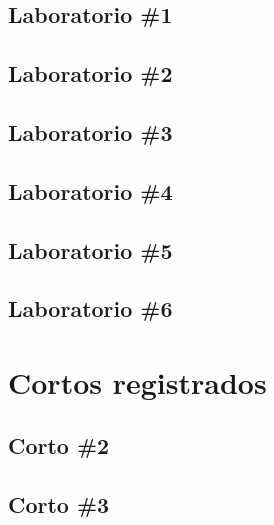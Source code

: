 \documentclass{book}
\begin{document}
\chapter{Laboratorio \#1}


\chapter{Laboratorio \#2}


\chapter{Laboratorio \#3}



\chapter{Laboratorio \#4}



\chapter{Laboratorio \#5}



\chapter{Laboratorio \#6}


\part{Cortos registrados}
\chapter{Corto \#2}


\chapter{Corto \#3}

\end{document}
